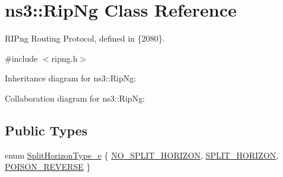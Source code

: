 \hypertarget{classns3_1_1RipNg}{}\section{ns3\+:\+:Rip\+Ng Class Reference}
\label{classns3_1_1RipNg}


R\+I\+Png Routing Protocol, defined in \{2080\}.  




{\ttfamily \#include $<$ripng.\+h$>$}



Inheritance diagram for ns3\+:\+:Rip\+Ng\+:


Collaboration diagram for ns3\+:\+:Rip\+Ng\+:
\subsection*{Public Types}
\begin{DoxyCompactItemize}
\item 
enum \hyperlink{classns3_1_1RipNg_a2baa3148870b411bccfe688079fb40a7}{Split\+Horizon\+Type\+\_\+e} \{ \hyperlink{classns3_1_1RipNg_a2baa3148870b411bccfe688079fb40a7a87060df7c85bafc99b78440f423a171b}{N\+O\+\_\+\+S\+P\+L\+I\+T\+\_\+\+H\+O\+R\+I\+Z\+ON}, 
\hyperlink{classns3_1_1RipNg_a2baa3148870b411bccfe688079fb40a7a65efd4b3a6b5b8be8e16038fec0cad4e}{S\+P\+L\+I\+T\+\_\+\+H\+O\+R\+I\+Z\+ON}, 
\hyperlink{classns3_1_1RipNg_a2baa3148870b411bccfe688079fb40a7a68187e765b02506b3891b87a513fac2f}{P\+O\+I\+S\+O\+N\+\_\+\+R\+E\+V\+E\+R\+SE}
 \}
\end{DoxyCompactItemize}
